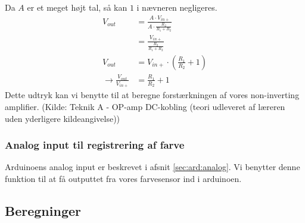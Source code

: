 Da $A$ er et meget højt tal, så kan $1$ i nævneren negligeres.
\begin{align}
V_{out}&=\frac{A\cdot V_{in+}}{A\cdot \frac{R_2}{R_1+R_2}}\\
&=\frac{V_{in+}}{\frac{R_2}{R_1+R_2}}\\
V_{out}&=V_{in+}\cdot(\frac{R_1}{R_2}+1)\\
\rightarrow \frac{V_{out}}{V_{in+}}&=\frac{R_1}{R_2}+1
\end{align}
Dette udtryk kan vi benytte til at beregne forstærkningen af vores non-inverting amplifier.
(Kilde: Teknik A - OP-amp DC-kobling (teori udleveret af læreren uden yderligere kildeangivelse))
\subsubsection{Analog input til registrering af farve}
Arduinoens analog input er beskrevet i afsnit \ref{sec:ard:analog}. Vi benytter denne funktion til at få outputtet fra vores farvesensor ind i arduinoen.
\subsection{Beregninger}
